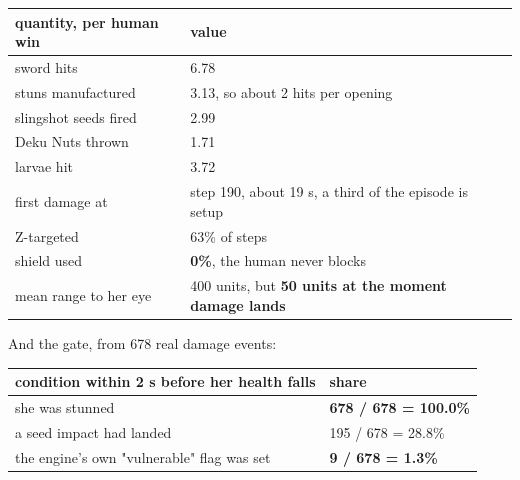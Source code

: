 \documentclass[11pt]{article}
\begin{document}
\begin{table}[!htbp]
  \centering
  \label{tab:thetaskmeasuredfrom100record}
\begin{center}\small
\begin{tabularx}{\linewidth}{@{}XX@{}}
\toprule
\textbf{quantity, per human win} & \textbf{value} \\
\midrule
sword hits & 6.78 \\
stuns manufactured & 3.13, so about 2 hits per opening \\
slingshot seeds fired & 2.99 \\
Deku Nuts thrown & 1.71 \\
larvae hit & 3.72 \\
first damage at & step 190, about 19 s, a third of the episode is setup \\
Z-targeted & 63\% of steps \\
shield used & \textbf{0\%}, the human never blocks \\
mean range to her eye & 400 units, but \textbf{50 units at the moment damage lands} \\
\bottomrule
\end{tabularx}
\end{center}
\end{table}

And the gate, from 678 real damage events:

\begin{table}[!htbp]
  \centering
  \label{tab:whatistrueinthetwosecondsbef}
\begin{center}\small
\begin{tabularx}{\linewidth}{@{}XX@{}}
\toprule
\textbf{condition within 2 s before her health falls} & \textbf{share} \\
\midrule
she was stunned & \textbf{678 / 678 = 100.0\%} \\
a seed impact had landed & 195 / 678 = 28.8\% \\
the engine's own "vulnerable" flag was set & \textbf{9 / 678 = 1.3\%} \\
\bottomrule
\end{tabularx}
\end{center}
\end{table}
\end{document}
